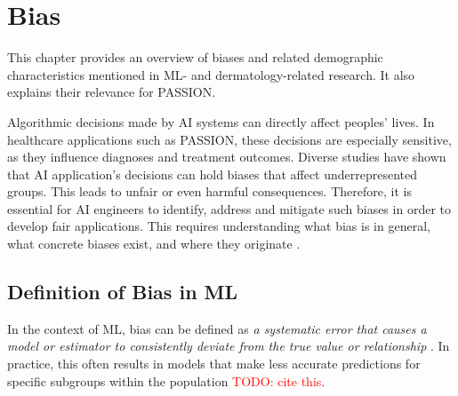 \documentclass[12pt, a4paper, oneside]{book}   	%
\renewcommand{\todo}[1]{\textcolor{red}{TODO: #1}}
\newif\ifrawcitationactive
\newcommand{\rawcitationusedstart}{\color{violet}}
\newcommand{\rawcitationusedend}{%
	\ifrawcitationactive
	\color{purple}  %
	\else
	\color{black}  %
	\fi
}
\begin{document}
		
		\section{Bias}
			This chapter provides an overview of biases and related demographic characteristics mentioned in \gls{ML}- and dermatology-related research. It also explains their relevance for PASSION.
			
			Algorithmic decisions made by \gls{AI} systems can directly affect peoples' lives. In healthcare applications such as PASSION, these decisions are especially sensitive, as they influence diagnoses and treatment outcomes. Diverse studies have shown that \gls{AI} application's decisions can hold biases that affect underrepresented groups. This leads to unfair or even harmful consequences. Therefore, it is essential for \gls{AI} engineers to identify, address and mitigate such biases in order to develop fair applications. This requires understanding what bias is in general, what concrete biases exist, and where they originate \autocite{Mehrabi_2021}.
			
			

		
			\subsection{Definition of Bias in \gls{ML}}
		    In the context of \gls{ML}, bias can be defined as \textit{a systematic error that causes a model or estimator to consistently deviate from the true value or relationship} \autocite{Delgado-Rodriguez_2004, Taylor_2023}. In practice, this often results in models that make less accurate predictions for specific subgroups within the population \todo{cite this}.
		    			    
\end{document}

